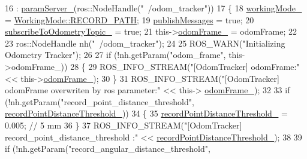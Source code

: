 \begin{DoxyCode}
16             : \hyperlink{classcl__move__base__z_1_1odom__tracker_1_1OdomTracker_a8bee0a1a49b5f736a7d7a741e56f7b02}{paramServer\_}(ros::NodeHandle(\textcolor{stringliteral}{"~/odom\_tracker"}))
17         \{
18             \hyperlink{classcl__move__base__z_1_1odom__tracker_1_1OdomTracker_a5ae598c85c4469f4c0e984480575c42b}{workingMode\_} = \hyperlink{namespacecl__move__base__z_1_1odom__tracker_ac46b05813b2791604f6cd0a39ace3ef8a023bc3adf68871ef7a0c616765ac80a7}{WorkingMode::RECORD\_PATH};
19             \hyperlink{classcl__move__base__z_1_1odom__tracker_1_1OdomTracker_a4f253d45ab5750dee3c2f18dd5599725}{publishMessages} = \textcolor{keyword}{true};
20             \hyperlink{classcl__move__base__z_1_1odom__tracker_1_1OdomTracker_afbe614b53a1493eb8268b8ea65b5b93a}{subscribeToOdometryTopic\_} = \textcolor{keyword}{true};
21             this->\hyperlink{classcl__move__base__z_1_1odom__tracker_1_1OdomTracker_a54f31af5e74006560d94f266297853d4}{odomFrame\_} = odomFrame;
22 
23             ros::NodeHandle nh(\textcolor{stringliteral}{"~/odom\_tracker"});
24 
25             ROS\_WARN(\textcolor{stringliteral}{"Initializing Odometry Tracker"});
26 
27             \textcolor{keywordflow}{if} (!nh.getParam(\textcolor{stringliteral}{"odom\_frame"}, this->odomFrame\_))
28             \{
29                 ROS\_INFO\_STREAM(\textcolor{stringliteral}{"[OdomTracker] odomFrame:"} << this->\hyperlink{classcl__move__base__z_1_1odom__tracker_1_1OdomTracker_a54f31af5e74006560d94f266297853d4}{odomFrame\_});
30             \}
31             ROS\_INFO\_STREAM(\textcolor{stringliteral}{"[OdomTracker] odomFrame overwriten by ros parameter:"} << this->
      \hyperlink{classcl__move__base__z_1_1odom__tracker_1_1OdomTracker_a54f31af5e74006560d94f266297853d4}{odomFrame\_});
32 
33             \textcolor{keywordflow}{if} (!nh.getParam(\textcolor{stringliteral}{"record\_point\_distance\_threshold"}, 
      \hyperlink{classcl__move__base__z_1_1odom__tracker_1_1OdomTracker_a3a1173716d527bd182d04656491e01dd}{recordPointDistanceThreshold\_}))
34             \{
35                 \hyperlink{classcl__move__base__z_1_1odom__tracker_1_1OdomTracker_a3a1173716d527bd182d04656491e01dd}{recordPointDistanceThreshold\_} = 0.005; \textcolor{comment}{// 5 mm}
36             \}
37             ROS\_INFO\_STREAM(\textcolor{stringliteral}{"[OdomTracker] record\_point\_distance\_threshold :"} << 
      \hyperlink{classcl__move__base__z_1_1odom__tracker_1_1OdomTracker_a3a1173716d527bd182d04656491e01dd}{recordPointDistanceThreshold\_});
38 
39             \textcolor{keywordflow}{if} (!nh.getParam(\textcolor{stringliteral}{"record\_angular\_distance\_threshold"}, 

\end{DoxyCode}

